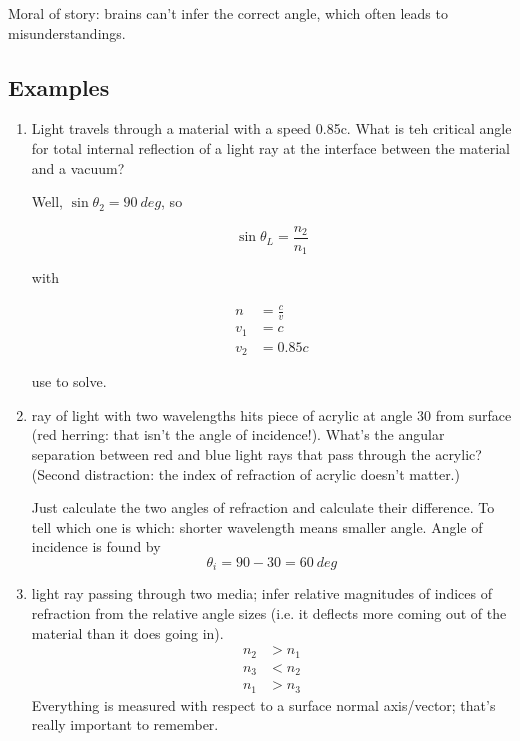 \documentclass[twocolumn,draft]{article}
\begin{document}
Moral of story: brains can't infer the correct angle, which often leads to misunderstandings.

\subsection*{Examples}
\begin{enumerate}
	\item 
		Light travels through a material with a speed 0.85c. What is teh critical angle for total
		internal
		reflection of a light ray at the interface between the material and a vacuum?

		Well, $\sin{\theta_{2}}=90~deg$, so

		\begin{equation}
			\sin{\theta_{L}} = \frac{n_{2}}{n_{1}}
		\end{equation}

		with

		\begin{align*}
			n &= \frac{c}{v} \\
			v_{1} &= c \\
			v_{2} &= 0.85c
		\end{align*}

		use to solve.
	
	\item
		ray of light with two wavelengths hits piece of acrylic at angle 30 from surface (red
		herring:
		that isn't the angle of incidence!). What's the angular separation between red and blue
		light
		rays that pass through the acrylic? (Second distraction: the index of refraction of acrylic
		doesn't matter.)
		
		Just calculate the two angles of refraction and calculate their difference. To tell which
		one is which: shorter wavelength means smaller angle. Angle of incidence is found by
			\begin{equation*}
				\theta_{i} = 90 - 30 = 60 ~deg
			\end{equation*}
			
	\item light ray passing through two media; infer relative magnitudes of indices of refraction
		from the relative angle sizes (i.e. it deflects more coming out of the material than it
		does going in).
			\begin{align*}
				n_{2} &> n_{1} \\
				n_{3} &< n_{2} \\
				n_{1} &> n_{3}
			\end{align*}
		Everything is measured with respect to a surface normal axis/vector; that's really important
		to remember.
			
\end{enumerate}
\end{document}
